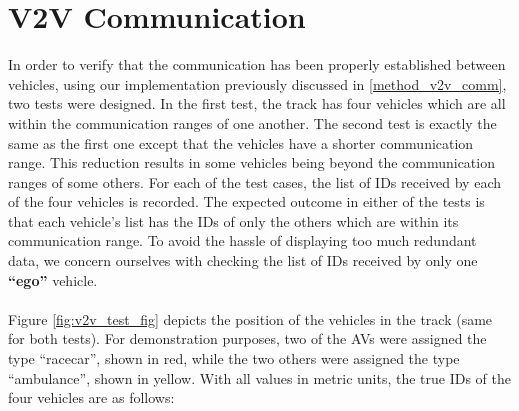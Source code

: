\section{V2V Communication}
\label{sec:test_v2v_comm}
\label{test_v2v_comm}
In order to verify that the communication has been properly established between vehicles, using our implementation previously discussed in \ref{method_v2v_comm}, two tests were designed. In the first test, the track has four vehicles which are all within the communication ranges of one another. The second test is exactly the same as the first one except that the vehicles have a shorter communication range. This reduction results in some vehicles being beyond the communication ranges of some others. For each of the test cases, the list of IDs received by each of the four vehicles is recorded. The expected outcome in either of the tests is that each vehicle’s list has the IDs of only the others which are within its communication range. To avoid the hassle of displaying too much redundant data, we concern ourselves with checking the list of IDs received by only one \textbf{“ego”} vehicle.
\\ \\
Figure \ref{fig:v2v_test_fig} depicts the position of the vehicles in the track (same for both tests). For demonstration purposes, two of the AVs were assigned the type “racecar”, shown in red, while the two others were assigned the type “ambulance”, shown in yellow. With all values in metric units, the true IDs of the four vehicles are as follows:


